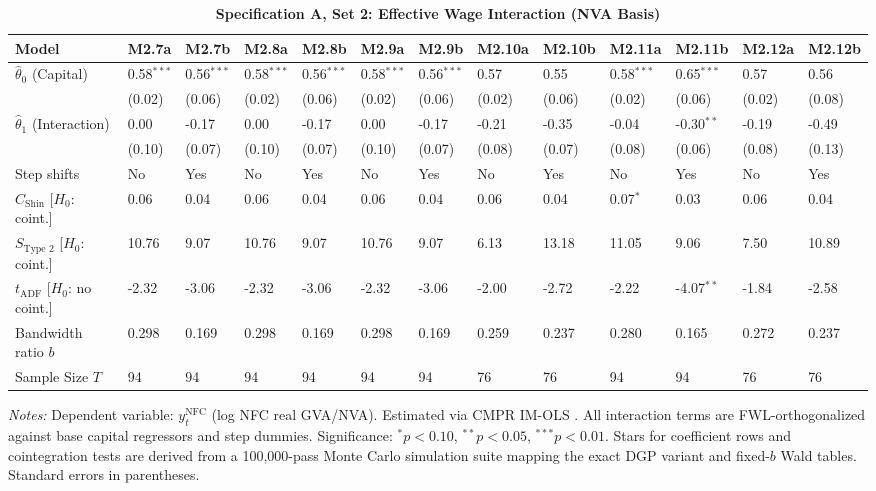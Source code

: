 \FloatBarrier
\begin{table}[h!]
	\centering
	\caption{\textbf{Specification A, Set 2: Effective Wage Interaction (NVA Basis)}}
	\label{tab:specA_set2_nva_app}
	\tiny
	\setlength{\tabcolsep}{1.5pt}
	\begin{tabular}{p{3.2cm}p{1.0cm}p{1.0cm}p{1.0cm}p{1.0cm}p{1.0cm}p{1.0cm}p{1.0cm}p{1.0cm}p{1.0cm}p{1.0cm}p{1.0cm}p{1.0cm}}
		\toprule
		Model & M2.7a & M2.7b & M2.8a & M2.8b & M2.9a & M2.9b & M2.10a & M2.10b & M2.11a & M2.11b & M2.12a & M2.12b \\
		\midrule
		$\hat{\theta}_0$ (Capital) & 0.58$^{***}$ & 0.56$^{***}$ & 0.58$^{***}$ & 0.56$^{***}$ & 0.58$^{***}$ & 0.56$^{***}$ & 0.57 & 0.55 & 0.58$^{***}$ & 0.65$^{***}$ & 0.57 & 0.56 \\
		& (0.02) & (0.06) & (0.02) & (0.06) & (0.02) & (0.06) & (0.02) & (0.06) & (0.02) & (0.06) & (0.02) & (0.08) \\
		$\hat{\theta}_1$ (Interaction) & 0.00 & -0.17 & 0.00 & -0.17 & 0.00 & -0.17 & -0.21 & -0.35 & -0.04 & -0.30$^{**}$ & -0.19 & -0.49 \\
		& (0.10) & (0.07) & (0.10) & (0.07) & (0.10) & (0.07) & (0.08) & (0.07) & (0.08) & (0.06) & (0.08) & (0.13) \\
		\midrule
		Step shifts & No & Yes & No & Yes & No & Yes & No & Yes & No & Yes & No & Yes \\
		$C_{\text{Shin}}$ [$H_0$: coint.] & 0.06 & 0.04 & 0.06 & 0.04 & 0.06 & 0.04 & 0.06 & 0.04 & 0.07$^{*}$ & 0.03 & 0.06 & 0.04 \\
		$S_{\text{Type 2}}$ [$H_0$: coint.] & 10.76 & 9.07 & 10.76 & 9.07 & 10.76 & 9.07 & 6.13 & 13.18 & 11.05 & 9.06 & 7.50 & 10.89 \\
		$t_{\text{ADF}}$ [$H_0$: no coint.] & -2.32 & -3.06 & -2.32 & -3.06 & -2.32 & -3.06 & -2.00 & -2.72 & -2.22 & -4.07$^{**}$ & -1.84 & -2.58 \\
		Bandwidth ratio $b$ & 0.298 & 0.169 & 0.298 & 0.169 & 0.298 & 0.169 & 0.259 & 0.237 & 0.280 & 0.165 & 0.272 & 0.237 \\
		Sample Size $T$ & 94 & 94 & 94 & 94 & 94 & 94 & 76 & 76 & 94 & 94 & 76 & 76 \\
		\bottomrule
	\end{tabular}
	\begin{minipage}{\textwidth}
		\scriptsize
		\textit{Notes:} Dependent variable: $y_t^{\text{NFC}}$ (log NFC real GVA/NVA). Estimated via CMPR IM-OLS \citep{VogelsangWagner2014}. All interaction terms are FWL-orthogonalized against base capital regressors and step dummies. Significance: $^*p<0.10$, $^{**}p<0.05$, $^{***}p<0.01$. Stars for coefficient rows and cointegration tests are derived from a 100,000-pass Monte Carlo simulation suite mapping the exact DGP variant and fixed-$b$ Wald tables. Standard errors in parentheses.
	\end{minipage}
\end{table}

